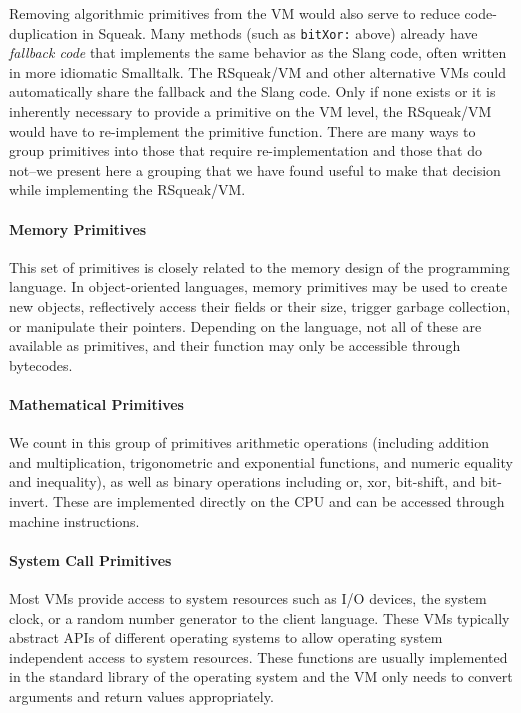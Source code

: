 \documentclass[
10pt,          %
]{sigplanconf}
\begin{document}
Removing algorithmic primitives from the \ac{VM} would also serve to reduce
code-duplication in Squeak. Many methods (such as \verb!bitXor:! above) already
have \emph{fallback code} that implements the same behavior as the Slang code,
often written in more idiomatic Smalltalk. The RSqueak/VM and other alternative
\acp{VM} could automatically share the fallback and the Slang code. Only if none
exists or it is inherently necessary to provide a primitive on the \ac{VM} level,
the RSqueak/VM would have to re-implement the primitive function. There are
many ways to group primitives into those that require re-implementation and
those that do not\---we present here a grouping that we have found useful to
make that decision while implementing the RSqueak/VM.



\paragraph{Memory Primitives}
\label{sec:memory-primitives}
This set of primitives is closely related to the memory design of the
programming language. In object-oriented languages, memory primitives
may be used to create new objects, reflectively access their fields or
their size, trigger garbage collection, or manipulate their
pointers. Depending on the language, not all of these are available as
primitives, and their function may only be accessible through
bytecodes.

\paragraph{Mathematical Primitives}
We count in this group of primitives arithmetic operations (including addition
and multiplication, trigonometric and exponential functions, and numeric
equality and inequality), as well as binary operations including or, xor,
bit-shift, and bit-invert. These are implemented directly on the CPU and can be
accessed through machine instructions.

\paragraph{System Call Primitives}
Most \acp{VM} provide access to system resources such as I/O devices, the
system clock, or a random number generator to the client language. These
\acp{VM} typically abstract \acp{API} of different operating systems to allow
operating system independent access to system resources. These functions are
usually implemented in the standard library of the operating system and the
\ac{VM} only needs to convert arguments and return values appropriately.
\end{document}
